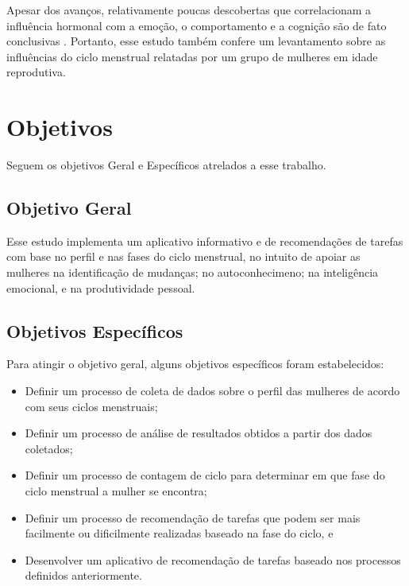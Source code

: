 Apesar dos avanços, relativamente poucas descobertas que correlacionam a influência hormonal com a 
emoção, o comportamento e a cognição são de fato conclusivas \cite{poroma2014}. Portanto, esse estudo 
também confere um levantamento sobre as influências do ciclo menstrual relatadas por um grupo de mulheres 
em idade reprodutiva.


\section{Objetivos}

Seguem os objetivos Geral e Específicos atrelados a esse trabalho.

\subsection{Objetivo Geral}


Esse estudo implementa um aplicativo informativo e de recomendações de tarefas com base no perfil e 
nas fases do ciclo menstrual, no intuito de apoiar as mulheres na identificação de mudanças; 
no autoconhecimeno; na inteligência emocional, e na produtividade pessoal.


\subsection{Objetivos Específicos}

Para atingir o objetivo geral, alguns objetivos específicos foram estabelecidos:

\begin{itemize}

        \item Definir um processo de coleta de dados sobre o perfil das mulheres de acordo com seus ciclos menstruais;
        
        \item Definir um processo de análise de resultados obtidos a partir dos dados coletados;

        \item Definir um processo de contagem de ciclo para determinar em que fase do ciclo menstrual a mulher se encontra;

        \item Definir um processo de recomendação de tarefas que podem ser mais facilmente ou dificilmente realizadas baseado na fase do ciclo, e

        \item Desenvolver um aplicativo de recomendação de tarefas baseado nos processos definidos anteriormente.

\end{itemize}

